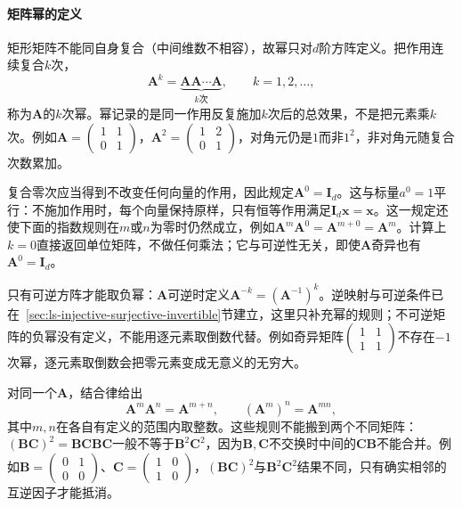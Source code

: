 \paragraph{矩阵幂的定义}

矩形矩阵不能同自身复合（中间维数不相容），故幂只对$d$阶方阵定义。把作用连续复合$k$次，
\begin{equation}
 \bm A^k=\underbrace{\bm A\bm A\cdots\bm A}_{k\text{次}},
 \qquad k=1,2,\ldots,
\end{equation}
称为$\bm A$的$k$次幂。幂记录的是同一作用反复施加$k$次后的总效果，不是把元素乘$k$次。例如$\bm A=\begin{pmatrix}1&1\\0&1\end{pmatrix}$，$\bm A^2=\begin{pmatrix}1&2\\0&1\end{pmatrix}$，对角元仍是$1$而非$1^2$，非对角元随复合次数累加。

复合零次应当得到不改变任何向量的作用，因此规定$\bm A^0=\bm I_d$。这与标量$a^0=1$平行：不施加作用时，每个向量保持原样，只有恒等作用满足$\bm I_d\bm x=\bm x$。这一规定还使下面的指数规则在$m$或$n$为零时仍然成立，例如$\bm A^m\bm A^0=\bm A^{m+0}=\bm A^m$。计算上$k=0$直接返回单位矩阵，不做任何乘法；它与可逆性无关，即使$\bm A$奇异也有$\bm A^0=\bm I_d$。

只有可逆方阵才能取负幂：$\bm A$可逆时定义$\bm A^{-k}=(\bm A^{-1})^k$。逆映射与可逆条件已在~\ref{sec:ls-injective-surjective-invertible}节建立，这里只补充幂的规则；不可逆矩阵的负幂没有定义，不能用逐元素取倒数代替。例如奇异矩阵$\begin{pmatrix}1&1\\1&1\end{pmatrix}$不存在$-1$次幂，逐元素取倒数会把零元素变成无意义的无穷大。

对同一个$\bm A$，结合律给出
\[
 \bm A^m\bm A^n=\bm A^{m+n},\qquad
 (\bm A^m)^n=\bm A^{mn},
\]
其中$m,n$在各自有定义的范围内取整数。这些规则不能搬到两个不同矩阵：$(\bm B\bm C)^2=\bm B\bm C\bm B\bm C$一般不等于$\bm B^2\bm C^2$，因为$\bm B,\bm C$不交换时中间的$\bm C\bm B$不能合并。例如$\bm B=\begin{pmatrix}0&1\\0&0\end{pmatrix}$、$\bm C=\begin{pmatrix}1&0\\1&0\end{pmatrix}$，$(\bm B\bm C)^2$与$\bm B^2\bm C^2$结果不同，只有确实相邻的互逆因子才能抵消。

